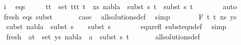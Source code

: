 \begin{isabellebody}
\ \ \ \ \isamarkupfalse%
\ i\ \isamarkupfalse%
\ eqs{\isacharcolon}{\kern0pt}\isanewline
\ \ \ \ {\isachardoublequoteopen}{\isasymforall}\ {\isacharparenleft}{\kern0pt}t{}{\isacharcomma}{\kern0pt}t{}{\isacharparenright}{\kern0pt}\ {\isasymin}\ set\ {\isacharparenleft}{\kern0pt}{\isacharparenleft}{\kern0pt}t{}{\isacharcomma}{\kern0pt}t{}{\isacharparenright}{\kern0pt}{\isacharhash}{\kern0pt}{\isacharparenleft}{\kern0pt}t{}{\isacharcomma}{\kern0pt}\ t{}{\isacharparenright}{\kern0pt}\ {\isacharhash}{\kern0pt}\ xs{\isacharparenright}{\kern0pt}{\isachardot}{\kern0pt}\ nabla{}\ {\isasymturnstile}\ subst\ s{}\ t{}\ {\isasymapprox}\ subst\ s{}\ t{}{\isachardoublequoteclose}\isanewline
\ \ \ \ \ \ \isamarkupfalse%
\ auto\isanewline
\isanewline
\ \ \ \ \isamarkupfalse%
\ fresh\ eqs\ subst\ \isanewline
\ \ \ \ \isamarkupfalse%
\ {\isacharquery}{\kern0pt}case\ \isamarkupfalse%
\ all{\isacharunderscore}{\kern0pt}solutions{\isacharunderscore}{\kern0pt}def\ \isamarkupfalse%
\ simp\isanewline
\ \isamarkupfalse%
\isanewline
\ \ \ \isamarkupfalse%
\ {\isacharparenleft}{\kern0pt}{}\ F\ t{}\ t{}\ xs\ ys{\isacharparenright}{\kern0pt}\isanewline
\ \ \ \isamarkupfalse%
\ \isamarkupfalse%
\ subst{\isacharcolon}{\kern0pt}\ {\isachardoublequoteopen}nabla{}\ {\isasymTurnstile}\ subst\ {\isacharparenleft}{\kern0pt}s{}\ {\isasymbullet}\ {\isacharbrackleft}{\kern0pt}{\isacharbrackright}{\kern0pt}{\isacharparenright}{\kern0pt}\ {\isasymapprox}\ subst\ s{}{\isachardoublequoteclose}\ \isanewline
\ \ \ \ \ \isamarkupfalse%
\ equ{\isacharunderscore}{\kern0pt}refl\ subst{\isacharunderscore}{\kern0pt}equ{\isacharunderscore}{\kern0pt}def\ \isamarkupfalse%
\ simp\isanewline
\isanewline
\ \ \ \isamarkupfalse%
\ {}\isanewline
\ \ \ \isamarkupfalse%
\ fresh{\isacharcolon}{\kern0pt}\ {\isachardoublequoteopen}{\isasymforall}\ {\isacharparenleft}{\kern0pt}a{\isacharcomma}{\kern0pt}t{\isacharparenright}{\kern0pt}\ {\isasymin}\ set\ ys{\isachardot}{\kern0pt}\ nabla{}\ {\isasymturnstile}\ a\ {\isasymsharp}\ subst\ s{}\ t{\isachardoublequoteclose}\isanewline
\ \ \ \ \ \isamarkupfalse%
\ all{\isacharunderscore}{\kern0pt}solutions{\isacharunderscore}{\kern0pt}def\ \isamarkupfalse%

\end{isabellebody}
